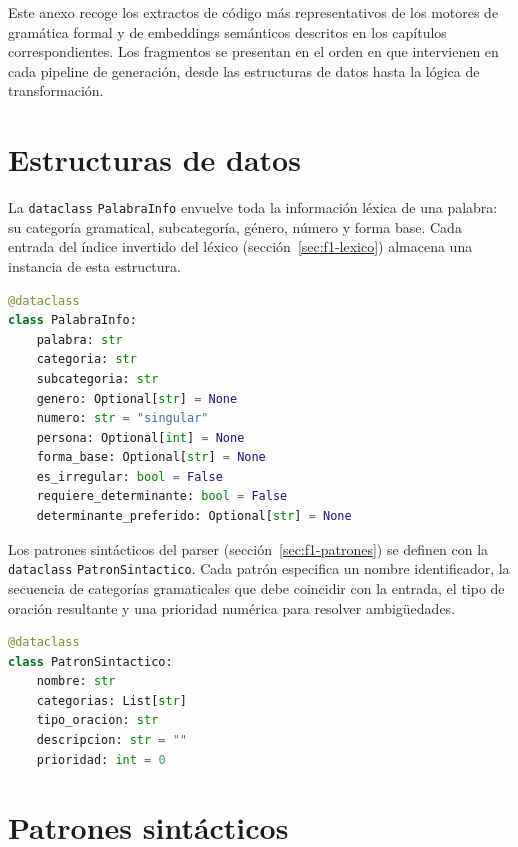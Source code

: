 Este anexo recoge los extractos de código más representativos de los motores de gramática formal y de embeddings semánticos descritos en los capítulos correspondientes. Los fragmentos se presentan en el orden en que intervienen en cada pipeline de generación, desde las estructuras de datos hasta la lógica de transformación.

\section{Estructuras de datos}

La \texttt{dataclass} \texttt{PalabraInfo} envuelve toda la información léxica de una palabra: su categoría gramatical, subcategoría, género, número y forma base. Cada entrada del índice invertido del léxico (sección~\ref{sec:f1-lexico}) almacena una instancia de esta estructura.

\begin{lstlisting}[language=Python,caption={Estructura \texttt{PalabraInfo} (\texttt{models.py}).},label={lst:palabrainfo},basicstyle=\ttfamily\small,xleftmargin=1cm]
@dataclass
class PalabraInfo:
    palabra: str
    categoria: str
    subcategoria: str
    genero: Optional[str] = None
    numero: str = "singular"
    persona: Optional[int] = None
    forma_base: Optional[str] = None
    es_irregular: bool = False
    requiere_determinante: bool = False
    determinante_preferido: Optional[str] = None
\end{lstlisting}

Los patrones sintácticos del parser (sección~\ref{sec:f1-patrones}) se definen con la \texttt{dataclass} \texttt{PatronSintactico}. Cada patrón especifica un nombre identificador, la secuencia de categorías gramaticales que debe coincidir con la entrada, el tipo de oración resultante y una prioridad numérica para resolver ambigüedades.

\begin{lstlisting}[language=Python,caption={Estructura \texttt{PatronSintactico} (\texttt{parser.py}).},label={lst:patron-sintactico},basicstyle=\ttfamily\small,xleftmargin=1cm]
@dataclass
class PatronSintactico:
    nombre: str
    categorias: List[str]
    tipo_oracion: str
    descripcion: str = ""
    prioridad: int = 0
\end{lstlisting}

\section{Patrones sintácticos}

